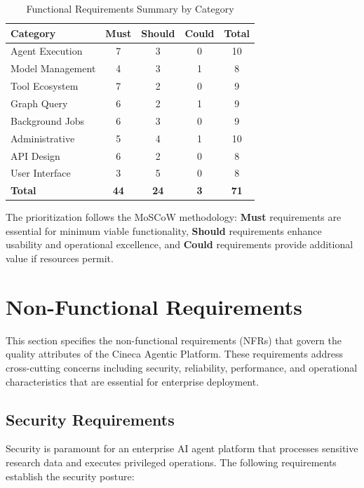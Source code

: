 \documentclass[a4paper,twoside]{sapthesis}
\begin{document}
\begin{table}[htbp]
\centering
\caption{Functional Requirements Summary by Category}
\label{tab:fr-summary}
\begin{tabular}{|l|c|c|c|c|}
\hline
\textbf{Category} & \textbf{Must} & \textbf{Should} & \textbf{Could} & \textbf{Total} \\
\midrule
Agent Execution & 7 & 3 & 0 & 10 \\
Model Management & 4 & 3 & 1 & 8 \\
Tool Ecosystem & 7 & 2 & 0 & 9 \\
Graph Query & 6 & 2 & 1 & 9 \\
Background Jobs & 6 & 3 & 0 & 9 \\
Administrative & 5 & 4 & 1 & 10 \\
API Design & 6 & 2 & 0 & 8 \\
User Interface & 3 & 5 & 0 & 8 \\
\midrule
\textbf{Total} & \textbf{44} & \textbf{24} & \textbf{3} & \textbf{71} \\
\midrule
\end{tabular}
\end{table}

The prioritization follows the MoSCoW methodology: \textbf{Must} requirements are essential for minimum viable functionality, \textbf{Should} requirements enhance usability and operational excellence, and \textbf{Could} requirements provide additional value if resources permit.

\section{Non-Functional Requirements}
\label{sec:nonfunctional-requirements}

This section specifies the non-functional requirements (NFRs) that govern the quality attributes of the Cineca Agentic Platform. These requirements address cross-cutting concerns including security, reliability, performance, and operational characteristics that are essential for enterprise deployment.

\subsection{Security Requirements}
\label{subsec:nfr-security}

Security is paramount for an enterprise AI agent platform that processes sensitive research data and executes privileged operations. The following requirements establish the security posture:
\end{document}
